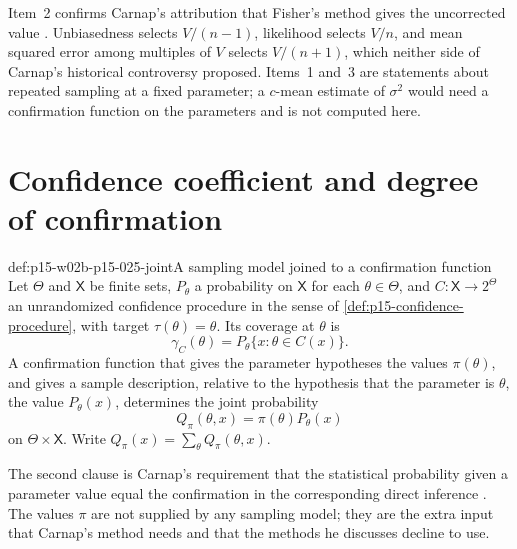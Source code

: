 Item~2 confirms Carnap's attribution that Fisher's method gives the
uncorrected value \cite[sec.~98, p.~513]{Carnap1950Probability}.
Unbiasedness selects \(V/(n-1)\), likelihood selects \(V/n\), and mean
squared error among multiples of \(V\) selects \(V/(n+1)\), which
neither side of Carnap's historical controversy proposed. Items~1
and~3 are statements about repeated sampling at a fixed parameter; a
\(c\)-mean estimate of \(\sigma^2\) would need a confirmation function
on the parameters and is not computed here.

\section{Confidence coefficient and degree of confirmation}
\label{sec:p15-w02b-p15-025-confidence}

\begin{hbdefinition}{def:p15-w02b-p15-025-joint}{A sampling model joined to a confirmation function}
Let \(\Theta\) and \(\mathsf X\) be finite sets, \(P_\theta\) a
probability on \(\mathsf X\) for each \(\theta\in\Theta\), and
\(C:\mathsf X\to2^\Theta\) an unrandomized confidence procedure in the
sense of \cref{def:p15-confidence-procedure}, with target
\(\tau(\theta)=\theta\). Its coverage at \(\theta\) is
\[
 \gamma_C(\theta)=P_\theta\{x:\theta\in C(x)\}.
\]
A confirmation function that gives the parameter hypotheses the values
\(\pi(\theta)\), and gives a sample description, relative to the
hypothesis that the parameter is \(\theta\), the value \(P_\theta(x)\),
determines the joint probability
\[
 Q_\pi(\theta,x)=\pi(\theta)P_\theta(x)
\]
on \(\Theta\times\mathsf X\). Write \(Q_\pi(x)=\sum_\theta Q_\pi(\theta,x)\).
\end{hbdefinition}

The second clause is Carnap's requirement that the statistical
probability given a parameter value equal the confirmation in the
corresponding direct inference \cite[sec.~98, p.~517]{Carnap1950Probability}.
The values \(\pi\) are not supplied by any sampling model; they are the
extra input that Carnap's method needs and that the methods he
discusses decline to use.

